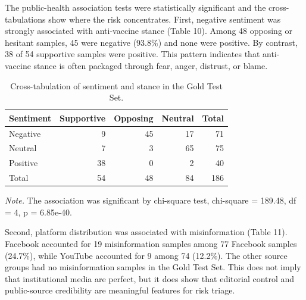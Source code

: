 \documentclass[runningheads]{llncs}
\begin{document}
The public-health association tests were statistically significant and the cross-tabulations show where the risk concentrates. First, negative sentiment was strongly associated with anti-vaccine stance (Table 10). Among 48 opposing or hesitant samples, 45 were negative (93.8\%) and none were positive. By contrast, 38 of 54 supportive samples were positive. This pattern indicates that anti-vaccine stance is often packaged through fear, anger, distrust, or blame.

\begin{table}[t]
\caption{Cross-tabulation of sentiment and stance in the Gold Test Set.}\label{tab:sentimentstance}
\centering
\small
\setlength{\tabcolsep}{4pt}
\renewcommand{\arraystretch}{1.05}
\begin{tabular}{lrrrr}
\hline
Sentiment & Supportive & Opposing & Neutral & Total\\
\hline
Negative & 9 & 45 & 17 & 71\\
Neutral & 7 & 3 & 65 & 75\\
Positive & 38 & 0 & 2 & 40\\
Total & 54 & 48 & 84 & 186\\
\hline
\end{tabular}
\vspace{2pt}
\parbox{\textwidth}{\footnotesize\emph{Note.} The association was significant by chi-square test, chi-square = 189.48, df = 4, p = 6.85e-40.}
\end{table}

Second, platform distribution was associated with misinformation (Table 11). Facebook accounted for 19 misinformation samples among 77 Facebook samples (24.7\%), while YouTube accounted for 9 among 74 (12.2\%). The other source groups had no misinformation samples in the Gold Test Set. This does not imply that institutional media are perfect, but it does show that editorial control and public-source credibility are meaningful features for risk triage.
\end{document}
